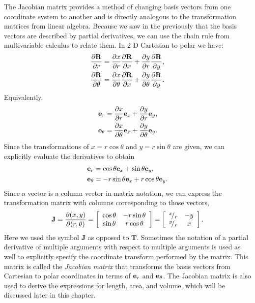 The Jacobian matrix provides a method of changing basis vectors from one coordinate system to another and is directly analogous to the transformation matrices from linear algebra. Because we saw in the previously that the basis vectors are described by partial derivatives, we can use the chain rule from multivariable calculus to relate them. In 2-D Cartesian to polar we have:
\begin{subequations}
\begin{align}
  \frac{ \partial {\mathbf{R}} }{ \partial {r} } &= \frac{ \partial {x} }{ \partial {r} } \frac{ \partial {\mathbf{R}} }{ \partial {x} } + \frac{ \partial {y} }{ \partial {r} } \frac{ \partial {\mathbf{R}} }{ \partial {y} } , \\
  \frac{ \partial {\mathbf{R}} }{ \partial {\theta} } &= \frac{ \partial {x} }{ \partial {\theta} } \frac{ \partial {\mathbf{R}} }{ \partial {x} } + \frac{ \partial {y} }{ \partial {\theta} } \frac{ \partial {\mathbf{R}} }{ \partial {y} } .
\end{align}
\end{subequations}
Equivalently,
\begin{subequations}
\begin{align}
  \mathbf{e}_r &= \frac{ \partial {x} }{ \partial {r} } \mathbf{e}_x + \frac{ \partial {y} }{ \partial {r} } \mathbf{e}_y , \\
  \mathbf{e}_\theta &= \frac{ \partial {x} }{ \partial {\theta} } \mathbf{e}_x + \frac{ \partial {y} }{ \partial {\theta} } \mathbf{e}_y.
\end{align}
\end{subequations}
Since the transformations of $x = r \cos \theta$ and $y = r \sin \theta$ are given, we can explicitly evaluate the derivatives to obtain
\begin{subequations}
\begin{align}
  \mathbf{e}_r &= \cos \theta \mathbf{e}_x + \sin \theta \mathbf{e}_y , \\
  \mathbf{e}_\theta &= -r \sin \theta \mathbf{e}_x + r \cos \theta \mathbf{e}_y.
\end{align}
\end{subequations}
Since a vector is a column vector in matrix notation, we can express the transformation matrix with columns corresponding to those vectors,
\begin{align}
  \mathbf{J} = \frac{ \partial ( x, y ) }{ \partial ( r, \theta ) } =
   \left[ \begin{array}{c c}
   \cos \theta &  -r \sin \theta \\
   \sin \theta &   r \cos \theta \\ \end{array} \right] =
   \left[ \begin{array}{c c}
   {}^{x}\!/_{r} & -y \\
   {}^{y}\!/_{r} &  x \\ \end{array} \right] .
\end{align}
Here we used the symbol $\mathbf{J}$ as opposed to $\mathbf{T}$. Sometimes the notation of a partial derivative of multiple arguments with respect to multiple arguments is used as well to explicitly specify the coordinate transform performed by the matrix. This matrix is called the \emph{Jacobian matrix} that transforms the basis vectors from Cartesian to polar coordinates in terms of $\mathbf{e}_r$ and $\mathbf{e}_\theta$. The Jacobian matrix is also used to derive the expressions for length, area, and volume, which will be discussed later in this chapter. 

